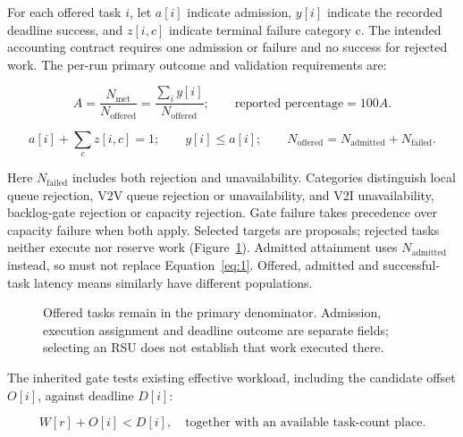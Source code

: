 \documentclass[11pt,a4paper]{article}
\begin{document}
For each offered task $i$, let $a[i]$ indicate admission, $y[i]$ indicate the recorded deadline success, and $z[i,c]$ indicate terminal failure category c. The intended accounting contract requires one admission or failure and no success for rejected work. The per-run primary outcome and validation requirements are:

\begin{equation}\label{eq:1}
 A=\frac{N_{\mathrm{met}}}{N_{\mathrm{offered}}}
  =\frac{\sum_i y[i]}{N_{\mathrm{offered}}};
 \qquad \text{reported percentage}=100A.
\end{equation}

\begin{equation}\label{eq:2}
 a[i]+\sum_c z[i,c]=1;\qquad y[i]\leq a[i];\qquad
 N_{\mathrm{offered}}=N_{\mathrm{admitted}}+N_{\mathrm{failed}}.
\end{equation}

Here $N_{\mathrm{failed}}$ includes both rejection and unavailability. Categories distinguish local queue rejection, V2V queue rejection or unavailability, and V2I unavailability, backlog-gate rejection or capacity rejection. Gate failure takes precedence over capacity failure when both apply. Selected targets are proposals; rejected tasks neither execute nor reserve work (Figure~\ref{fig:2}). Admitted attainment uses $N_{\mathrm{admitted}}$ instead, so must not replace Equation~\eqref{eq:1}. Offered, admitted and successful-task latency means similarly have different populations.

\begin{figure}[htbp]
\centering

\caption{Offered tasks remain in the primary denominator. Admission, execution assignment and deadline outcome are separate fields; selecting an RSU does not establish that work executed there.}\label{fig:2}
\end{figure}

The inherited gate tests existing effective workload, including the candidate offset $O[i]$, against deadline $D[i]$:

\begin{equation}\label{eq:3}
 W[r]+O[i]<D[i],\quad\text{together with an available task-count place.}
\end{equation}
\end{document}
